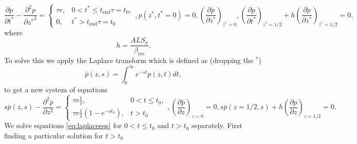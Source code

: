 \begin{subequations}
\begin{equation}
	\frac{\partial p}{\partial t^*} -\frac{\partial^2 p}{\partial {z^*}^2} =
	\begin{cases}
		\tau r, & 0< t^* \leq t_{\mathrm{end}}\tau =t_0,\\
		0, & t^* > t_{\mathrm{end}}\tau =t_0
	\end{cases},
\end{equation}
\begin{equation}
    p(z^*,t^*=0)=0,
\end{equation}
\begin{equation}
    \left(\frac{\partial p }{\partial z^*}\right)_{z^*=0},
\end{equation}
\begin{equation}
    \left(\frac{\partial p}{\partial t^*}\right)_{z^*=1/2} +
    h\left(\frac{\partial p}{\partial z^*}\right)_{z^*=1/2} = 0,
\end{equation}
\end{subequations}
where
\begin{equation}
    h = \frac{ALS_{\sigma}}{\beta_{\mathrm{res}}}.
\end{equation}
To solve this we apply the Laplace transform which is defined as (dropping the $^*$)
\begin{equation}
    \bar{p}(z,s) = \int_0^{\infty}e^{-st}p(z,t)dt,
\end{equation}
to get a new system of equations 
\begin{subequations}\label{eq:laplaceeqs}
\begin{equation}
	s\bar{p}(z,s) - \frac{\partial^2\bar{p}}{\partial z^2} =
	\begin{cases}
		\tau r \frac{1}{s}, & 0< t \leq t_0,\\
		\tau r \frac{1}{s} \left(1 - e^{-st_0}\right), & t > t_0
	\end{cases},
\end{equation}
\begin{equation}\label{eq:bc1}
    \left(\frac{\partial \bar{p} }{\partial z}\right)_{z=0} = 0,
\end{equation}
\begin{equation}\label{eq:bc2}
    s\bar{p}(z=1/2,s) +
    h\left(\frac{\partial p}{\partial z}\right)_{z=1/2} = 0.
\end{equation}
\end{subequations}
We solve equations \ref{eq:laplaceeqs} for $0< t \leq t_0$ and $t > t_0$ separately. First finding a particular solution for $t > t_0$
